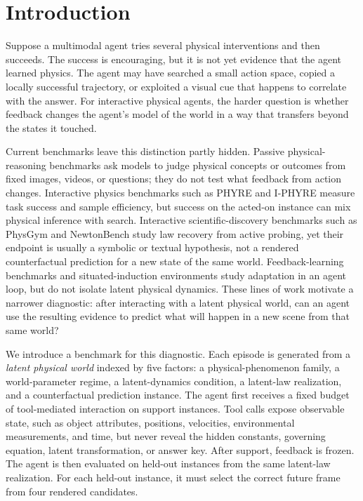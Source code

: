 \section{Introduction}
\label{sec:intro}

Suppose a multimodal agent tries several physical interventions and then succeeds. The success is encouraging, but it is not yet evidence that the agent learned physics. The agent may have searched a small action space, copied a locally successful trajectory, or exploited a visual cue that happens to correlate with the answer. For interactive physical agents, the harder question is whether feedback changes the agent's model of the world in a way that transfers beyond the states it touched.

Current benchmarks leave this distinction partly hidden. Passive physical-reasoning benchmarks ask models to judge physical concepts or outcomes from fixed images, videos, or questions; they do not test what feedback from action changes. Interactive physics benchmarks such as PHYRE and I-PHYRE measure task success and sample efficiency, but success on the acted-on instance can mix physical inference with search. Interactive scientific-discovery benchmarks such as PhysGym and NewtonBench study law recovery from active probing, yet their endpoint is usually a symbolic or textual hypothesis, not a rendered counterfactual prediction for a new state of the same world. Feedback-learning benchmarks and situated-induction environments study adaptation in an agent loop, but do not isolate latent physical dynamics. These lines of work motivate a narrower diagnostic: after interacting with a latent physical world, can an agent use the resulting evidence to predict what will happen in a new scene from that same world?

We introduce a benchmark for this diagnostic. Each episode is generated from a \emph{latent physical world} indexed by five factors: a physical-phenomenon family, a world-parameter regime, a latent-dynamics condition, a latent-law realization, and a counterfactual prediction instance. The agent first receives a fixed budget of tool-mediated interaction on support instances. Tool calls expose observable state, such as object attributes, positions, velocities, environmental measurements, and time, but never reveal the hidden constants, governing equation, latent transformation, or answer key. After support, feedback is frozen. The agent is then evaluated on held-out instances from the same latent-law realization. For each held-out instance, it must select the correct future frame from four rendered candidates.

